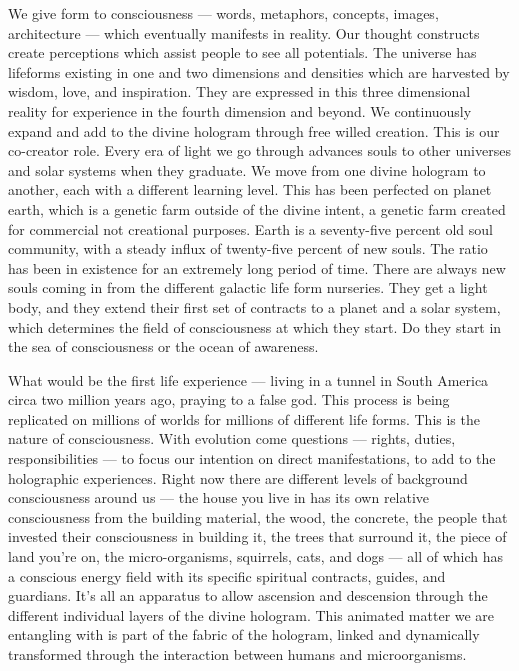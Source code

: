\documentclass[letterpaper,11pt,twoside,titlepage,onecolumn,openany]{book}
\begin{document}
We give form to consciousness --- words, metaphors, concepts, images,
architecture --- which eventually manifests in reality. Our thought
constructs create perceptions which assist people to see all potentials.
The universe has lifeforms existing in one and two dimensions and
densities which are harvested by wisdom, love, and inspiration. They are
expressed in this three dimensional reality for experience in the fourth
dimension and beyond. We continuously expand and add to the divine
hologram through free willed creation. This is our co-creator role.
Every era of light we go through advances souls to other universes and
solar systems when they graduate. We move from one divine hologram to
another, each with a different learning level. This has been perfected
on planet earth, which is a genetic farm outside of the divine intent, a
genetic farm created for commercial not creational purposes. Earth is a
seventy-five percent old soul community, with a steady influx of
twenty-five percent of new souls. The ratio has been in existence for an
extremely long period of time. There are always new souls coming in from
the different galactic life form nurseries. They get a light body, and
they extend their first set of contracts to a planet and a solar system,
which determines the field of consciousness at which they start. Do they
start in the sea of consciousness or the ocean of awareness.

What would be the first life experience --- living in a tunnel in South
America circa two million years ago, praying to a false god. This
process is being replicated on millions of worlds for millions of
different life forms. This is the nature of consciousness. With
evolution come questions --- rights, duties, responsibilities --- to
focus our intention on direct manifestations, to add to the holographic
experiences. Right now there are different levels of background
consciousness around us --- the house you live in has its own relative
consciousness from the building material, the wood, the concrete, the
people that invested their consciousness in building it, the trees that
surround it, the piece of land you're on, the micro-organisms,
squirrels, cats, and dogs --- all of which has a conscious energy field
with its specific spiritual contracts, guides, and guardians. It's all
an apparatus to allow ascension and descension through the different
individual layers of the divine hologram. This animated matter we are
entangling with is part of the fabric of the hologram, linked and
dynamically transformed through the interaction between humans and
microorganisms.
\end{document}
